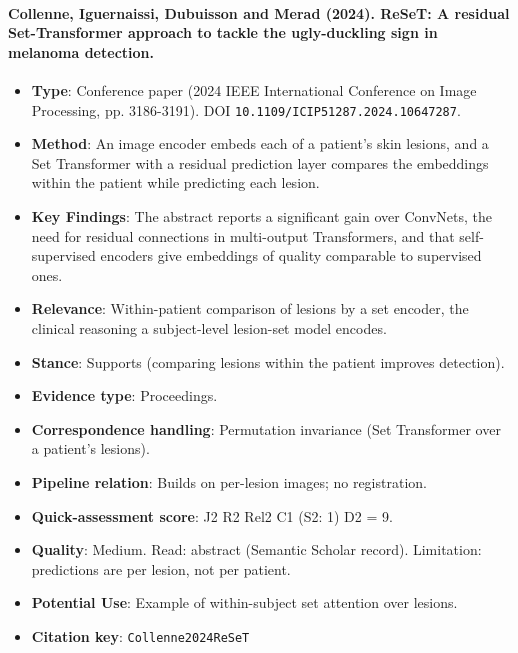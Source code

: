 \documentclass[journal,onecolumn]{IEEEtran}
\begin{document}
\paragraph{Collenne, Iguernaissi, Dubuisson and Merad (2024). ReSeT: A residual Set-Transformer approach to tackle the ugly-duckling sign in melanoma detection.~\cite{Collenne2024ReSeT}}\mbox{}

\begin{itemize}

\item{} \textbf{Type}: Conference paper (2024 IEEE International Conference on Image Processing, pp. 3186-3191). DOI \nolinkurl{10.1109/ICIP51287.2024.10647287}.

\item{} \textbf{Method}: An image encoder embeds each of a patient's skin lesions, and a Set Transformer with a residual prediction layer compares the embeddings within the patient while predicting each lesion.

\item{} \textbf{Key Findings}: The abstract reports a significant gain over ConvNets, the need for residual connections in multi-output Transformers, and that self-supervised encoders give embeddings of quality comparable to supervised ones.

\item{} \textbf{Relevance}: Within-patient comparison of lesions by a set encoder, the clinical reasoning a subject-level lesion-set model encodes.

\item{} \textbf{Stance}: Supports (comparing lesions within the patient improves detection).

\item{} \textbf{Evidence type}: Proceedings.

\item{} \textbf{Correspondence handling}: Permutation invariance (Set Transformer over a patient's lesions).

\item{} \textbf{Pipeline relation}: Builds on per-lesion images; no registration.

\item{} \textbf{Quick-assessment score}: J2 R2 Rel2 C1 (S2: 1) D2 = 9.

\item{} \textbf{Quality}: Medium. Read: abstract (Semantic Scholar record). Limitation: predictions are per lesion, not per patient.

\item{} \textbf{Potential Use}: Example of within-subject set attention over lesions.

\item{} \textbf{Citation key}: \texttt{Collenne2024ReSeT}

\end{itemize}
\end{document}
